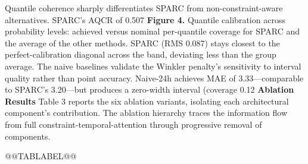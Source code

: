{Quantile coherence sharply differentiates SPARC from non-constraint-aware alternatives. SPARC's AQCR of 0.507%
\textbf{Figure 4.} Quantile calibration across probability levels: achieved versus nominal per-quantile coverage for SPARC and the average of the other methods. SPARC (RMS 0.087) stays closest to the perfect-calibration diagonal across the band, deviating less than the group average.
The naive baselines validate the Winkler penalty's sensitivity to interval quality rather than point accuracy. Naive-24h achieves MAE of 3.33---comparable to SPARC's 3.20---but produces a zero-width interval (coverage 0.12%
\textbf{Ablation Results}
Table 3 reports the six ablation variants, isolating each architectural component's contribution. The ablation hierarchy traces the information flow from full constraint-temporal-attention through progressive removal of components.
\begin{table}[t]
\caption{}
@@TABLABEL@@
\centering
\resizebox{\columnwidth}{!}{
\begin{tabular}{lllllll}
\toprule
\textbf{Variant} & \textbf{Coverage (90%
\midrule
Full SPARC & \textbf{87.94} & \textbf{20.72} & 2.20 & 1.335 & 3.20 & 4.45 \\
}
\end{tabular}}
\end{table}}
